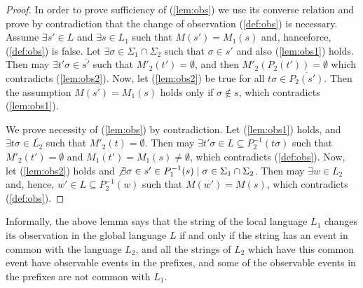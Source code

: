 \documentclass[a4paper, 10pt, conference]{ieeeconf}
\begin{document}
\begin{proof}
In order to prove sufficiency of (\ref{lem:obs}) we use its converse relation
and prove by contradiction that the change of observation (\ref{def:obs}) is
necessary.
Assume $\exists s' \in L$ and $\exists s \in L_1$ such that
$M(s')= M_1(s)$ and, hanceforce, (\ref{def:obs}) is false. Let $\exists
\sigma \in \Sigma_1 \cap \Sigma_2$ such that $\sigma \in s'$ and also
(\ref{lem:obs1}) holds. Then may $\exists t'\sigma \in \overline{s'}$ such that
$M'_2(t') = \emptyset$, and then $M'_2(P_2(t')) =
\emptyset$ which contradicts (\ref{lem:obs2}). Now, let (\ref{lem:obs2})
be true for all $t\sigma \in \overline{P_2(s')}$. Then the assumption $M(s')=
M_1(s)$ holds only if $\sigma \not \in s$, which contradicts (\ref{lem:obs1}). 

We prove necessity of (\ref{lem:obs}) by contradiction.
Let (\ref{lem:obs1}) holds, and $\exists t\sigma \in \overline{L_2}$ such that
$M'_2(t) = \emptyset$. Then may $\exists t'\sigma \in 
L \subseteq P_2^{-1}(t\sigma)$ such that $M'_2(t') =
\emptyset$ and $M_1(t') = M_1(s) \neq \emptyset$, which contradicts
(\ref{def:obs}).
Now, let (\ref{lem:obs2}) holds and $\not \exists \sigma \in s' \in P_1^{-1}(s)
\mid \sigma \in \Sigma_1 \cap \Sigma_2$. Then may $\exists w \in L_2$ and,
hence, $w' \in L \subseteq P_2^{-1}(w)$ such that $M(w')=M(s)$,
which contradicts (\ref{def:obs}).
\end{proof}

Informally, the above lemma says that the string of the local language $L_1$
changes its observation in the global language $L$ if and only if the string has
an event in common with the language $L_2$, and all the strings of $L_2$ which
have this common event have observable events in the prefixes, and some of the
observable events in the prefixes are not common with $L_1$.
\end{document}
